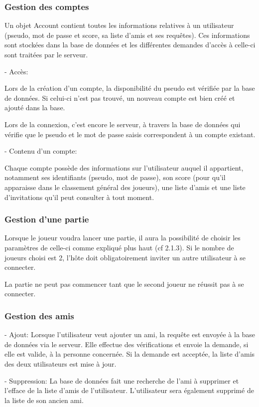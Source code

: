 \documentclass[a4paper,12pt]{article}
\begin{document}
\subsubsection{Gestion des comptes}
Un objet Account contient toutes les informations relatives à un utilisateur (pseudo, mot de passe et score, sa liste d'amis et ses requêtes). 
Ces informations sont stockées dans la base de données et les différentes demandes d'accès à celle-ci sont traitées par le serveur.

- Accès:

Lors de la création d'un compte, la disponibilité du pseudo est vérifiée par la base de données. Si celui-ci n'est pas trouvé, un nouveau compte est bien créé et ajouté dans la base.

Lors de la connexion, c'est encore le serveur, à travers la base de données qui vérifie que le pseudo et le mot de passe saisis correspondent à un compte existant.

- Contenu d'un compte:

Chaque compte possède des informations sur l'utilisateur auquel il appartient, notamment ses identifiants (pseudo, mot de passe), son score (pour qu'il apparaisse dans le classement général des joueurs), une liste d'amis et une liste d'invitations qu'il peut consulter à tout moment.

\subsubsection{Gestion d'une partie}

Lorsque le joueur voudra lancer une partie,
il aura la possibilité de choisir les paramètres de celle-ci comme expliqué plus haut (cf 2.1.3). Si le nombre de joueurs choisi est 2, l'hôte doit obligatoirement inviter un autre utilisateur à se connecter.

La partie ne peut pas commencer tant que le second joueur ne réussit pas à se connecter.
\subsubsection{Gestion des amis}

- Ajout: Lorsque l'utilisateur veut ajouter un ami, la requête est envoyée à la base de données via le serveur. Elle effectue des vérifications et envoie la demande, si elle est valide, à la personne concernée. Si la demande est acceptée, la liste d'amis des deux utilisateurs est mise à jour.

- Suppression: La base de données fait une recherche de l'ami à supprimer et l'efface de la liste d'amis de l'utilisateur. L'utilisateur sera également supprimé de la liste de son ancien ami.
\end{document}
